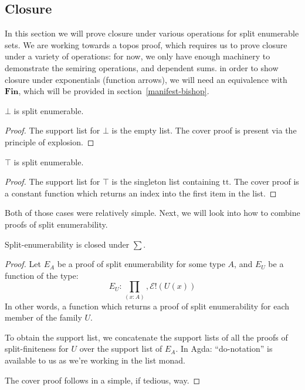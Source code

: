\subsection{Closure}
In this section we will prove closure under various operations for split
enumerable sets.
We are working towards a topos proof, which requires us to prove closure under
a variety of operations: for now, we only have enough machinery to demonstrate
the semiring operations, and dependent sums.
in order to show closure under exponentials (function arrows), we will need an
equivalence with \(\mathbf{Fin}\), which will be provided in
section~\ref{manifest-bishop}.
\begin{rm-lemma}
  \(\bot\) is split enumerable.
\end{rm-lemma}
\begin{proof}
  The support list for \(\bot\) is the empty list.
  The cover proof is present via the principle of explosion.
\end{proof}
\begin{rm-lemma}
  \(\top\) is split enumerable.
\end{rm-lemma}
\begin{proof}
  The support list for \(\top\) is the singleton list containing \(\text{tt}\).
  The cover proof is a constant function which returns an index into the first
  item in the list.
\end{proof}
Both of those cases were relatively simple.
Next, we will look into how to combine proofs of split enumerability.
\begin{rm-theorem}
  Split-enumerability is closed under \(\sum\).
\end{rm-theorem}
\begin{proof}
  Let \(E_A\) be a proof of split enumerability for some type \(A\), and \(E_U\)
  be a function of the type:
  \begin{equation}
    E_U : \prod_{(x : A)} , \mathcal{E}!(U(x))
  \end{equation}
  In other words, a function which returns a proof of split enumerability for
  each member of the family \(U\).

  To obtain the support list, we concatenate the support lists of all the proofs
  of split-finiteness for \(U\) over the support list of \(E_A\).
  In Agda:
  ``do-notation'' is available to us as we're working in the list monad.

  The cover proof follows in a simple, if tedious, way.
\end{proof}
